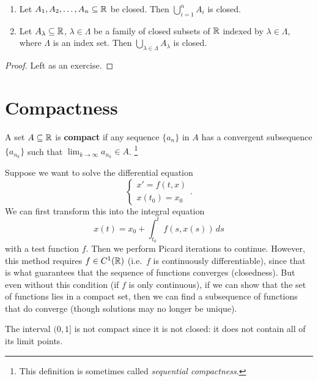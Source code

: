 \begin{theorem}\leavevmode
  \begin{enumerate}
    \item Let $A_1, A_2, \dots, A_n \subseteq \mathbb{R}$ be closed.
      Then $\bigcup_{i = 1}^n A_i$ is closed.
    \item Let $A_\lambda \subseteq \mathbb{R}$, $\lambda \in \Lambda$
      be a family of closed subsets of $\mathbb{R}$ indexed by
      $\lambda \in \Lambda$, where $\Lambda$ is an index
      set. Then $\bigcup_{\lambda \in \Lambda} A_\lambda$
      is closed.
  \end{enumerate}
\end{theorem}

\begin{proof}
  Left as an exercise.
\end{proof}

\section{Compactness}

\begin{definition}
  A set $A \subseteq \mathbb{R}$ is \textbf{compact} if any sequence
  $\{a_n\}$ in $A$ has a convergent subsequence
  $\{a_{n_k}\}$ such that $\lim_{k \to \infty} a_{n_k} \in A$.
  \footnote{This definition is sometimes called \textit{sequential compactness}.}
\end{definition}

\begin{remark}
  Suppose we want to solve the differential equation
  \[
  \begin{cases}
    x' = f(t, x) \\
    x(t_0) = x_0
  \end{cases}
  .\]
  We can first transform this into the integral equation
  \[
    x(t) = x_0 + \int_{t_0}^t f(s, x(s))\, ds
  \]
  with a test function $f$.
  Then we perform Picard iterations to continue. However, this
  method requires $f \in C^{1}(\mathbb{R})$ (i.e.~$f$ is continuously
  differentiable), since that is what
  guarantees that the sequence of functions converges
  (closedness).
  But even without this condition (if $f$ is only continuous),
  if we can
  show that the set of functions lies in a compact set,
  then we can find a subsequence of functions that do converge
  (though solutions may no longer be unique).
\end{remark}

\begin{example}
  The interval $(0, 1]$ is not compact since it is not closed:
  it does not contain all of its limit points.
\end{example}

